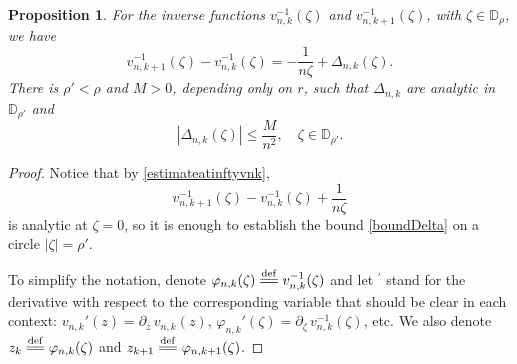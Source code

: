 \documentclass[reqno,11pt]{amsart}
\theoremstyle{plain}
\newtheorem{prop}[thm]{Proposition}
\theoremstyle{definition}
\theoremstyle{remark}
\numberwithin{equation}{section}
\numberwithin{equation}{section}
\newcommand{\D}{\mathbb{D}}
\newcommand{\isdef}{\overset{\mathrm{def}}{=\joinrel=}}
\begin{document}
\begin{prop}
    \label{lem5}
For the inverse functions $v_{n, k}^{-1}(\zeta)$ and $v_{n, k+1}^{-1}(\zeta)$, with $\zeta \in \D_\rho$, we have
\begin{equation}
    \label{eq:12}
v_{n,k+1}^{-1}\left(\zeta\right)-v_{n, k}^{-1}(\zeta)=-\frac{1}{n \zeta}  +\Delta_{n, k}(\zeta).
\end{equation}
There is $\rho'<\rho$ and $M>0$, depending only on $r$, such that $\Delta_{n, k}$ are analytic in $\D_{\rho'}$ and 
\begin{equation}
    \label{boundDelta}
    \left|\Delta_{n, k}(\zeta)\right| \leq \frac{M}{n^2 }, \quad \zeta \in \D_{\rho'}.
\end{equation}
\end{prop}
\begin{proof}
Notice that by \eqref{estimateatinftyvnk}, 
$$
v_{n,k+1}^{-1}\left(\zeta\right)-v_{n, k}^{-1}(\zeta) +\frac{1}{n \zeta} 
$$
is analytic at $\zeta=0$, so it is enough to establish the bound \eqref{boundDelta} on a circle $|\zeta|=\rho'$.

To simplify the notation, denote $\varphi_{n, k}(\zeta)\isdef v_{n, k}^{-1}(\zeta)$ and let $^\prime$ stand for the derivative with respect to the corresponding variable that should be clear in each context: $v_{n, k}'(z)=\partial_z \,   v_{n, k}(z)$, $\varphi_{n, k}'(\zeta)=\partial_\zeta \,   v_{n, k}^{-1}(\zeta)$, etc. We also denote $z_k\isdef \varphi_{n, k}(\zeta)$ and $z_{k+1}\isdef \varphi_{n, k+1}(\zeta)$. 


\end{proof}
\end{document}
